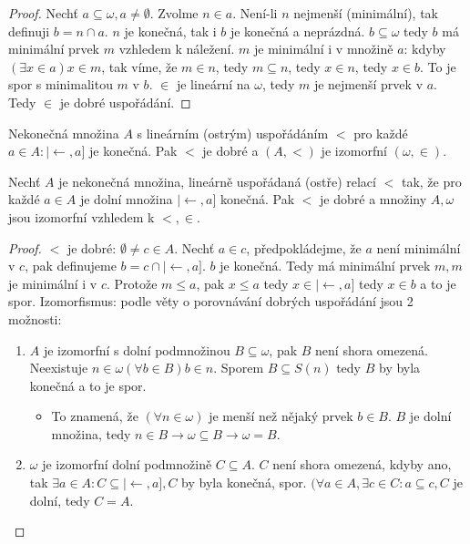 \begin{proof}
	Nechť $a \subseteq \omega, a \neq \emptyset$. Zvolme $n \in a$. Není-li $n$ nejmenší (minimální), tak definuji $b = n \cap a$. $n$ je konečná, tak i $b$ je konečná a neprázdná. $b \subseteq \omega$ tedy $b$ má minimální prvek $m$ vzhledem k náležení. $m$ je minimální i v množině $a$: kdyby $(\exists x \in a) x \in m$, tak víme, že $m \in n$, tedy $m \subseteq n$, tedy $x \in n$, tedy $x \in b$. To je spor s minimalitou $m$ v $b$. $\in$ je lineární na $\omega$, tedy $m$ je nejmenší prvek v $a$. Tedy $\in$ je dobré uspořádání.
\end{proof}

\begin{pozn}
	Nekonečná množina $A$ s lineárním (ostrým) uspořádáním $<$ pro každé $a \in A: |\leftarrow, a]$ je konečná. Pak $<$ je dobré a $(A,<)$ je izomorfní $(\omega, \in)$.
\end{pozn}

\begin{thm}
	Nechť $A$ je nekonečná množina, lineárně uspořádaná (ostře) relací $<$ tak, že pro každé $a \in A$ je dolní množina $|\leftarrow , a]$ konečná. Pak $<$ je dobré a množiny $A, \omega$ jsou izomorfní vzhledem k $<, \in$.
\end{thm}

\begin{proof}
	$<$ je dobré: $\emptyset \neq c \in A$. Nechť $a \in c$, předpokládejme, že $a$ není minimální v $c$, pak definujeme $b = c \cap |\leftarrow, a]$. $b$ je konečná. Tedy má minimální prvek $m, m$ je minimální i v $c$. Protože $m \leq a$, pak $x \leq a$ tedy $x \in |\leftarrow, a]$ tedy $x \in b$ a to je spor. Izomorfismus: podle věty o porovnávání dobrých uspořádání jsou 2 možnosti:
	
	\begin{enumerate}
		\item $A$ je izomorfní s dolní podmnožinou $B \subseteq \omega$, pak $B$ není shora omezená. Neexistuje $n \in \omega (\forall b \in B) b \in n$. Sporem $B \subseteq S(n)$ tedy $B$ by byla konečná a to je spor.
		\begin{itemize}
			\item To znamená, že $(\forall n \in \omega)$ je menší než nějaký prvek $b \in B$. $B$ je dolní množina, tedy $n \in B \rightarrow \omega \subseteq B \rightarrow \omega = B$.
		\end{itemize}
		\item $\omega$ je izomorfní dolní podmnožině $C \subseteq A$. $C$ není shora omezená, kdyby ano, tak $\exists a \in A : C \subseteq |\leftarrow, a], C$ by byla konečná, spor. $(\forall a \in A, \exists c \in C: a \subseteq c, C$ je dolní, tedy $C= A$.
	\end{enumerate}
\end{proof}

